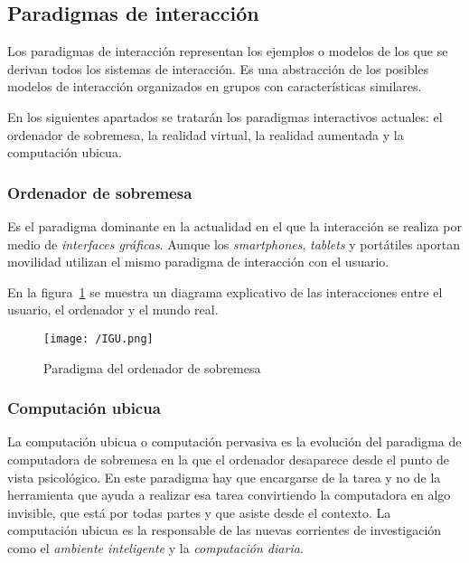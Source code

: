 \subsection{Paradigmas de interacción}

Los paradigmas de interacción representan los ejemplos o modelos de los que se derivan todos los
sistemas de interacción. Es una abstracción de los posibles modelos de interacción organizados en
grupos con características similares.

En los siguientes apartados se tratarán los paradigmas interactivos actuales: el ordenador de
sobremesa, la realidad virtual, la realidad aumentada y la computación ubicua.

\subsubsection{Ordenador de sobremesa}

Es el paradigma dominante en la actualidad en el que la interacción se realiza por medio de
\emph{interfaces gráficas}. Aunque los \emph{smartphones}, \emph{tablets} y portátiles aportan
movilidad utilizan el mismo paradigma de interacción con el usuario.

En la figura~\ref{fig:igu} se muestra un diagrama explicativo de las interacciones entre el usuario,
el ordenador y el mundo real.\\

\begin{figure}[!h]
  \begin{center}
    \texttt{[image: /IGU.png]}
    \caption{Paradigma del ordenador de sobremesa}
    \label{fig:igu}
  \end{center}
\end{figure}

\subsubsection{Computación ubicua}

La computación ubicua o computación pervasiva es la evolución del paradigma de computadora de
sobremesa en la que el ordenador desaparece desde el punto de vista psicológico. En este paradigma
hay que encargarse de la tarea y no de la herramienta que ayuda a realizar esa tarea convirtiendo la
computadora en algo invisible, que está por todas partes y que asiste desde el contexto. La
computación ubicua es la responsable de las nuevas corrientes de investigación como el
\emph{ambiente inteligente} y la \emph{computación diaria}.

